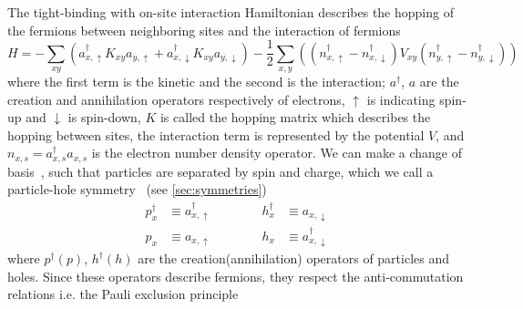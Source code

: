 The tight-binding with on-site interaction Hamiltonian describes the hopping of the fermions between neighboring sites and the interaction of fermions
\begin{equation}
    H = - \sum_{xy} \left( a^\dagger_{x,\uparrow} K_{xy} a_{y,\uparrow} + a^\dagger_{x,\downarrow} K_{xy} a_{y,\downarrow} \right) - \frac{1}{2} \sum_{x,y} \left( (n^\dagger_{x,\uparrow} - n^\dagger_{x,\downarrow}) V_{xy} (n^\dagger_{y,\uparrow} - n^\dagger_{y,\downarrow}) \right)
\end{equation}
where the first term is the kinetic and the second is the interaction; $a^\dagger$, $a$ are the creation and annihilation operators respectively of electrons, $\uparrow$ is indicating spin-up and $\downarrow$ is spin-down, $K$ is called the hopping matrix which describes the hopping between sites, the interaction term is represented by the potential $V$, and $n_{x,s} = a^\dagger_{x,s} a_{x,s}$ is the electron number density operator. We can make a change of basis~\cite{avoiding}, such that particles are separated by spin and charge, which we call a particle-hole symmetry~\cite{phex1} (see \cref{sec:symmetries})
\begin{equation}
    \begin{aligned}
        p^\dagger_x & \equiv a^\dagger_{x,\uparrow} \qquad\qquad h^\dagger_x & \equiv a_{x,\downarrow} \\
        p_x & \equiv a_{x,\uparrow} \qquad\qquad h_x & \equiv a^\dagger_{x,\downarrow}
    \end{aligned}
    \label{eq:ph-switch}
\end{equation}
where $p^\dagger (p)$, $h^\dagger (h)$ are the creation(annihilation) operators of particles and holes. Since these operators describe fermions, they respect the anti-commutation relations i.e. the Pauli exclusion principle

